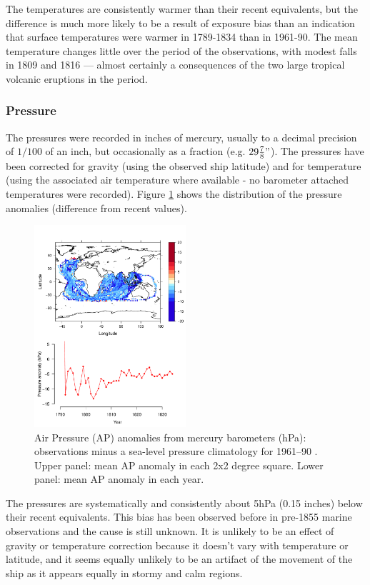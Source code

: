 \documentclass[CP]{copernicus}
\begin{document}
The temperatures are consistently warmer than their recent equivalents, but the difference is much more likely to be a result of exposure bias than an indication that surface temperatures were warmer in 1789-1834 than in 1961-90. The mean temperature changes little over the period of the observations, with modest falls in 1809 and 1816 --- almost certainly a consequences of the two large tropical volcanic eruptions in the period. 

\subsubsection{Pressure}
\label{Spressure}

The pressures were recorded in inches of mercury, usually to a decimal precision of $1/100$ of an inch, but occasionally as a fraction (e.g. $29 {7\over8}"$). The pressures have been corrected for gravity (using the observed ship latitude) and for temperature (using the associated air temperature where available - no barometer attached temperatures were recorded). Figure \ref{pwat2} shows the distribution of the pressure anomalies (difference from recent values).
\begin{figure}[!hbp]
\begin{center}
\includegraphics[angle=0, width=0.5\textwidth]{../figures/pressures}
\caption{Air Pressure (AP) anomalies from mercury barometers (hPa): observations minus a sea-level pressure climatology for 1961--90 \citep{allan06meansealevelpressure}. Upper panel: mean AP anomaly in each 2x2 degree square. Lower panel: mean AP anomaly in each year.}
\label{pwat2}
\end{center}
\end{figure}
The pressures are systematically and consistently about 5hPa (0.15 inches) below their recent equivalents. This bias has been observed before in pre-1855 marine observations \citep{ansell06emulate,brohan10corral} and the cause is still unknown. It is unlikely to be an effect of gravity or temperature correction because it doesn't vary with temperature or latitude, and it seems equally unlikely to be an artifact of the movement of the ship as it appears equally in stormy and calm regions.
\end{document}
